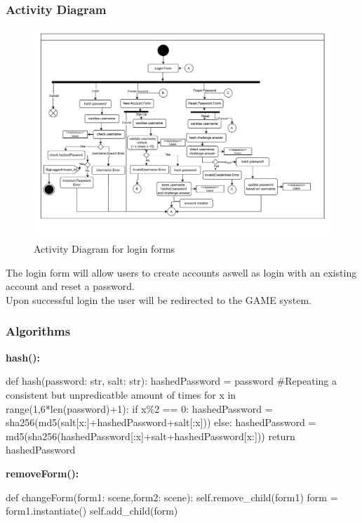 \documentclass{article}
\begin{document}
        \subsubsection{Activity Diagram}
        \begin{figure}[H]
                \centering
                \includegraphics[width=\textwidth, trim = 0 50 0 0, clip]{images/design/Login_System.pdf}
                \caption{Activity Diagram for login forms}
                \label{fig:ie_2}
        \end{figure}
        The login form will allow users to create accounts aswell as login with an existing account and reset a password.\\
        Upon successful login the user will be redirected to the GAME system.\\
        \subsubsection{Algorithms}
        \textbf{hash():}\\
        \begin{python}
def hash(password: str, salt: str):
   hashedPassword = password
   #Repeating a consistent but unpredicatble amount of times
   for x in range(1,6*len(password)+1):
      if x\%2 == 0:
         hashedPassword = sha256(md5(salt[x:]+hashedPassword+salt[:x]))
      else:
         hashedPassword = md5(sha256(hashedPassword[:x]+salt+hashedPassword[x:]))
        return hashedPassword
        \end{python}
        \textbf{removeForm():}\\
        \begin{python}
def changeForm(form1: scene,form2: scene):
   self.remove_child(form1)
   form  = form1.instantiate()
   self.add_child(form)
        \end{python}
\end{document}
